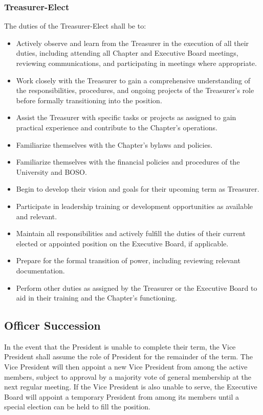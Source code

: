 \documentclass[10pt, oneside]{article}
\begin{document}
\subsubsection{Treasurer-Elect}
The duties of the Treasurer-Elect shall be to:
\begin{itemize}
    \item Actively observe and learn from the Treasurer in the execution of all their duties, including attending all Chapter and Executive Board meetings, reviewing communications, and participating in meetings where appropriate.
    \item Work closely with the Treasurer to gain a comprehensive understanding of the responsibilities, procedures, and ongoing projects of the Treasurer's role before formally transitioning into the position.
    \item Assist the Treasurer with specific tasks or projects as assigned to gain practical experience and contribute to the Chapter's operations.
    \item Familiarize themselves with the Chapter's bylaws and policies.
    \item Familiarize themselves with the financial policies and procedures of the University and BOSO.
    \item Begin to develop their vision and goals for their upcoming term as Treasurer.
    \item Participate in leadership training or development opportunities as available and relevant.
     \item Maintain all responsibilities and actively fulfill the duties of their current elected or appointed position on the Executive Board, if applicable.
    \item Prepare for the formal transition of power, including reviewing relevant documentation.
    \item Perform other duties as assigned by the Treasurer or the Executive Board to aid in their training and the Chapter's functioning.
\end{itemize}

\subsection{Officer Succession}

In the event that the President is unable to complete their term, the Vice President shall assume the role of President for the remainder of the term. The Vice President will then appoint a new Vice President from among the active members, subject to approval by a majority vote of general membership at the next regular meeting. If the Vice President is also unable to serve, the Executive Board will appoint a temporary President from among its members until a special election can be held to fill the position.
\end{document}
